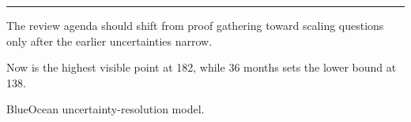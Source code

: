 \documentclass[10pt,a4paper]{article}
\begin{document}
\vspace{3pt}\noindent\begin{minipage}[t]{0.58\linewidth}
\textcolor{BOGreen}{\rule{24mm}{0.6pt}}\par\vspace{3pt}
{\footnotesize\color{BOText} The review agenda should shift from proof gathering toward scaling questions only after the earlier uncertainties narrow.}\par\vspace{2pt}
{\footnotesize\color{BOText} Now is the highest visible point at 182, while 36 months sets the lower bound at 138.}\par\vspace{2pt}
\end{minipage}\hfill\begin{minipage}[t]{0.36\linewidth}
\par
\end{minipage}\par\vspace{2pt}
\par
{\scriptsize\color{BOMuted} BlueOcean uncertainty-resolution model.}\par
\end{document}
